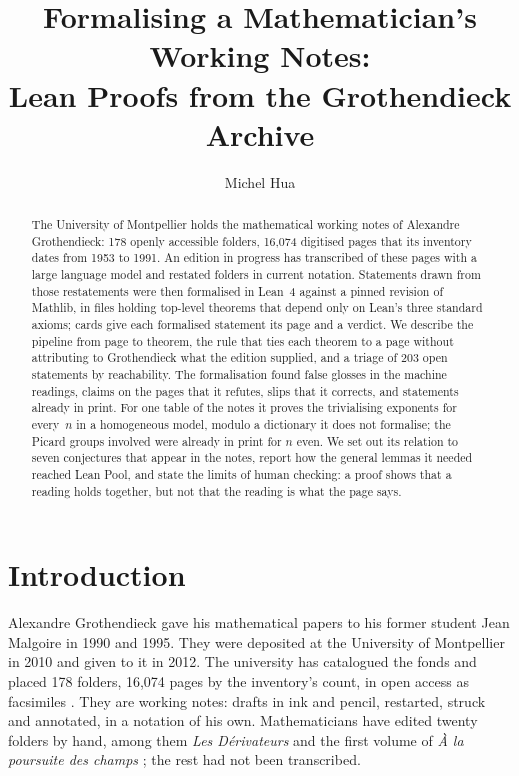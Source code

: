\documentclass[runningheads,a4paper]{llncs}
\begin{document}
\title{Formalising a Mathematician's Working Notes:\\ Lean Proofs from the Grothendieck Archive}
\author{Michel Hua}
\maketitle

\begin{abstract}
The University of Montpellier holds the mathematical working notes of Alexandre Grothendieck: 178 openly accessible folders, 16,074 digitised pages that its inventory dates from 1953 to 1991. An edition in progress has transcribed \cntPages{} of these pages with a large language model and restated \cntHandFolders{} folders in current notation. Statements drawn from those restatements were then formalised in Lean~4 against a pinned revision of Mathlib, in \cntFiles{} files holding \cntTheorems{} top-level theorems that depend only on Lean's three standard axioms; \cntCards{} cards give each formalised statement its page and a verdict. We describe the pipeline from page to theorem, the rule that ties each theorem to a page without attributing to Grothendieck what the edition supplied, and a triage of 203 open statements by reachability. The formalisation found false glosses in the machine readings, claims on the pages that it refutes, slips that it corrects, and statements already in print. For one table of the notes it proves the trivialising exponents for every~$n$ in a homogeneous model, modulo a dictionary it does not formalise; the Picard groups involved were already in print for $n$ even. We set out its relation to seven conjectures that appear in the notes, report how the general lemmas it needed reached Lean Pool, and state the limits of human checking: a proof shows that a reading holds together, but not that the reading is what the page says.
\end{abstract}

\section{Introduction}

Alexandre Grothendieck gave his mathematical papers to his former student Jean Malgoire in 1990 and 1995. They were deposited at the University of Montpellier in 2010 and given to it in 2012. The university has catalogued the fonds and placed 178 folders, 16,074 pages by the inventory's count, in open access as facsimiles \cite{montpellier}. They are working notes: drafts in ink and pencil, restarted, struck and annotated, in a notation of his own. Mathematicians have edited twenty folders by hand, among them \emph{Les Dérivateurs} \cite{kmm} and the first volume of \emph{À la poursuite des champs} \cite{maltsiniotis2022}; the rest had not been transcribed.
\end{document}
